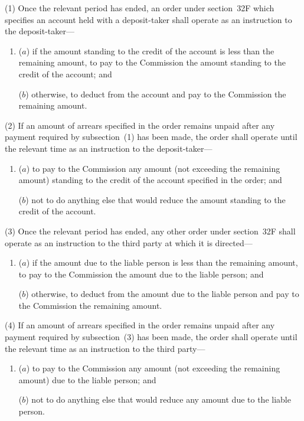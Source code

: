\documentclass[12pt,a4paper]{article}
\begin{document}
(1) Once the relevant period has ended, an order under section~32F which specifies an account held with a deposit-taker shall operate as an instruction to the deposit-taker---
\begin{enumerate}\item[]
($a$) if the amount standing to the credit of the account is less than the remaining amount, to pay to the Commission the amount standing to the credit of the account; and

($b$) otherwise, to deduct from the account and pay to the Commission the remaining amount.
\end{enumerate}

(2) If an amount of arrears specified in the order remains unpaid after any payment required by subsection~(1) has been made, the order shall operate until the relevant time as an instruction to the deposit-taker---
\begin{enumerate}\item[]
($a$) to pay to the Commission any amount (not exceeding the remaining
amount) standing to the credit of the account specified in the order; and

($b$) not to do anything else that would reduce the amount standing to the credit
of the account.
\end{enumerate}

(3) Once the relevant period has ended, any other order under section~32F shall
operate as an instruction to the third party at which it is directed---
\begin{enumerate}\item[]
($a$) if the amount due to the liable person is less than the remaining amount, to
pay to the Commission the amount due to the liable person; and

($b$) otherwise, to deduct from the amount due to the liable person and pay to the
Commission the remaining amount.
\end{enumerate}

(4) If an amount of arrears specified in the order remains unpaid after any payment
required by subsection~(3) has been made, the order shall operate until the relevant
time as an instruction to the third party---
\begin{enumerate}\item[]
($a$) to pay to the Commission any amount (not exceeding the remaining
amount) due to the liable person; and

($b$) not to do anything else that would reduce any amount due to the liable
person.
\end{enumerate}
\end{document}
